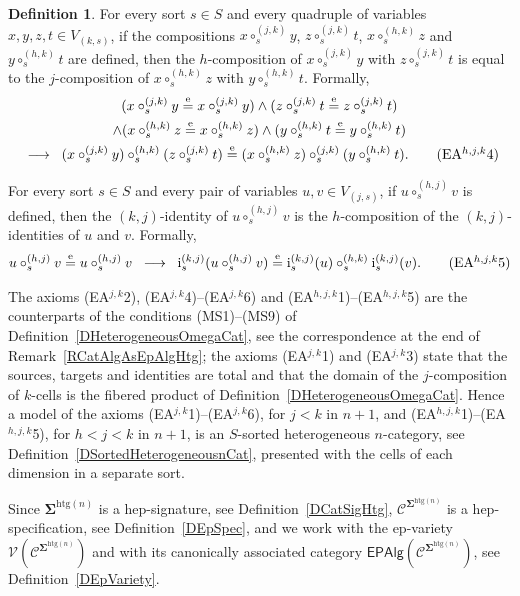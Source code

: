 \documentclass[a4paper, reqno]{amsbook}
\newcommand{\sig}[1]{\mathbf{#1}}             %
\newcommand{\spec}[1]{\boldsymbol{\mathcal{#1}}} %
\newcommand{\eeq}{\overset{\mathrm e}{=}}      %
\newcommand{\htg}{\mathrm{htg}}                %
\theoremstyle{plain}
\theoremstyle{definition}
\newtheorem{definition}[theorem]{Definition}
\begin{document}
\begin{definition}
For every sort $s\in S$ and every quadruple of variables $x,y,z,t\in V_{(k,s)}$, if the compositions $x\circ^{(j,k)}_{s}y$, $z\circ^{(j,k)}_{s}t$, $x\circ^{(h,k)}_{s}z$ and $y\circ^{(h,k)}_{s}t$ are defined, then the $h$-composition of $x\circ^{(j,k)}_{s}y$ with $z\circ^{(j,k)}_{s}t$ is equal to the $j$-composition of $x\circ^{(h,k)}_{s}z$ with $y\circ^{(h,k)}_{s}t$.
Formally,
\begin{multline*}
(x\circ^{(j,k)}_{s}y\eeq x\circ^{(j,k)}_{s}y)
\wedge
(z\circ^{(j,k)}_{s}t\eeq z\circ^{(j,k)}_{s}t)
\\
\wedge
(x\circ^{(h,k)}_{s}z\eeq x\circ^{(h,k)}_{s}z)
\wedge
(y\circ^{(h,k)}_{s}t\eeq y\circ^{(h,k)}_{s}t)
\\
\;\;\longrightarrow\;\;
(x\circ^{(j,k)}_{s}y)\circ^{(h,k)}_{s}(z\circ^{(j,k)}_{s}t)\eeq
(x\circ^{(h,k)}_{s}z)\circ^{(j,k)}_{s}(y\circ^{(h,k)}_{s}t).
\label{ACatHtgEAhjk4}\tag{EA$^{h,j,k}$4}
\end{multline*}

For every sort $s\in S$ and every pair of variables $u,v\in V_{(j,s)}$, if $u\circ^{(h,j)}_{s}v$ is defined, then the $(k,j)$-identity of $u\circ^{(h,j)}_{s}v$ is the $h$-composition of the $(k,j)$-identities of $u$ and $v$.
Formally,
\begin{align*}
u\circ^{(h,j)}_{s}v\eeq u\circ^{(h,j)}_{s}v \;\;\longrightarrow\;\;
\mathrm{i}^{(k,j)}_{s}(u\circ^{(h,j)}_{s}v)\eeq\mathrm{i}^{(k,j)}_{s}(u)\circ^{(h,k)}_{s}\mathrm{i}^{(k,j)}_{s}(v).
\label{ACatHtgEAhjk5}\tag{EA$^{h,j,k}$5}
\end{align*}

The axioms (EA$^{j,k}$2), (EA$^{j,k}$4)--(EA$^{j,k}$6) and (EA$^{h,j,k}$1)--(EA$^{h,j,k}$5) are the counterparts of the conditions (MS1)--(MS9) of Definition~\ref{DHeterogeneousOmegaCat}, see the correspondence at the end of Remark~\ref{RCatAlgAsEpAlgHtg}; the axioms (EA$^{j,k}$1) and (EA$^{j,k}$3) state that the sources, targets and identities are total and that the domain of the $j$-composition of $k$-cells is the fibered product of Definition~\ref{DHeterogeneousOmegaCat}.
Hence a model of the axioms (EA$^{j,k}$1)--(EA$^{j,k}$6), for $j<k$ in $n+1$, and (EA$^{h,j,k}$1)--(EA$^{h,j,k}$5), for $h<j<k$ in $n+1$, is an $S$-sorted heterogeneous $n$-category, see Definition~\ref{DSortedHeterogeneousnCat}, presented with the cells of each dimension in a separate sort.

Since $\sig{\Sigma}^{\htg(n)}$ is a hep-signature, see Definition~\ref{DCatSigHtg}, $\spec{C}^{\sig{\Sigma}^{\htg(n)}}$ is a hep-specification, see Definition~\ref{DEpSpec}, and we work with the ep-variety $\mathcal{V}(\spec{C}^{\sig{\Sigma}^{\htg(n)}})$ and with its canonically associated category $\mathsf{EPAlg}(\spec{C}^{\sig{\Sigma}^{\htg(n)}})$, see Definition~\ref{DEpVariety}.
\end{definition}
\end{document}
